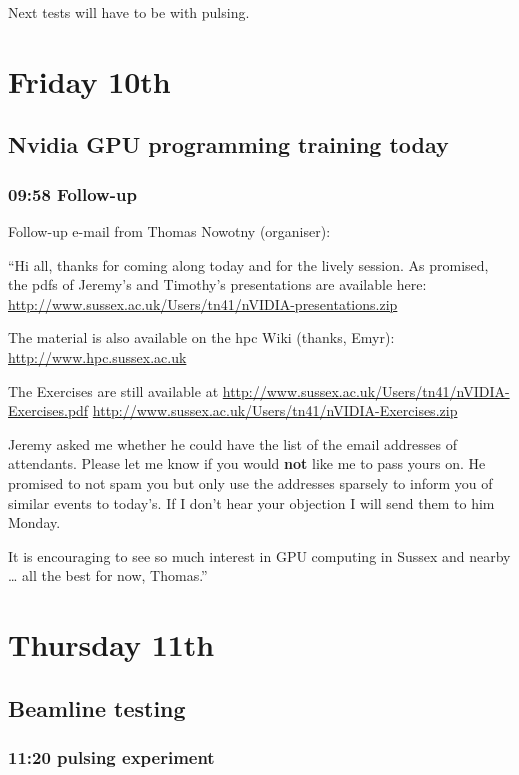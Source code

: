 \documentclass[11pt]{article}
\begin{document}
Next tests will have to be with pulsing.
\section*{Friday 10th}
\label{sec-2}
\subsection*{Nvidia GPU programming training today}
\label{sec-2-1}
\subsubsection*{09:58 Follow-up}
\label{sec-2-1-1}

Follow-up e-mail from Thomas Nowotny (organiser):

``Hi all,
thanks for coming along today and for the lively session. As promised,
the pdfs of Jeremy's and Timothy's presentations are available here:
\href{http://www.sussex.ac.uk/Users/tn41/nVIDIA-presentations.zip}{http://www.sussex.ac.uk/Users/tn41/nVIDIA-presentations.zip}

The material is also available on the hpc Wiki (thanks, Emyr):
\href{http://www.hpc.sussex.ac.uk}{http://www.hpc.sussex.ac.uk}

The Exercises are still available at
\href{http://www.sussex.ac.uk/Users/tn41/nVIDIA-Exercises.pdf}{http://www.sussex.ac.uk/Users/tn41/nVIDIA-Exercises.pdf}
\href{http://www.sussex.ac.uk/Users/tn41/nVIDIA-Exercises.zip}{http://www.sussex.ac.uk/Users/tn41/nVIDIA-Exercises.zip}

Jeremy asked me whether he could have the list of the email addresses
of attendants. Please let me know if you would \textbf{not} like me to pass
yours on. He promised to not spam you but only use the addresses
sparsely to inform you of similar events to today's. If I don't hear
your objection I will send them to him Monday.

It is encouraging to see so much interest in GPU computing in Sussex
and nearby \ldots{} all the best for now, Thomas.''
\section*{Thursday 11th}
\label{sec-3}
\subsection*{Beamline testing}
\label{sec-3-1}
\subsubsection*{11:20 pulsing experiment}
\label{sec-3-1-1}
\end{document}
